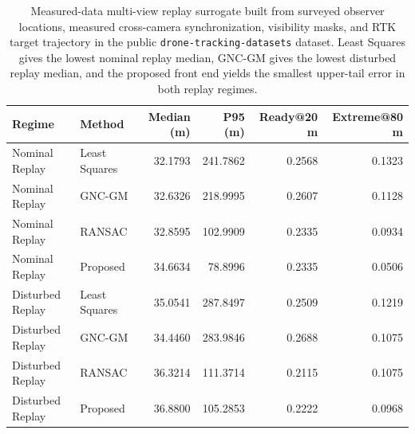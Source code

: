 \begin{table}[!htbp]
\centering
\caption{Measured-data multi-view replay surrogate built from surveyed observer locations, measured cross-camera synchronization, visibility masks, and RTK target trajectory in the public \texttt{drone-tracking-datasets} dataset. Least Squares gives the lowest nominal replay median, GNC-GM gives the lowest disturbed replay median, and the proposed front end yields the smallest upper-tail error in both replay regimes.}
\label{tab:publicrealreplay}
\small
\begin{tabular}{llrrrr}
\toprule
Regime & Method & Median (m) & P95 (m) & Ready@20 m & Extreme@80 m \\
\midrule
Nominal Replay   & Least Squares & 32.1793 & 241.7862 & 0.2568 & 0.1323 \\
Nominal Replay   & GNC-GM        & 32.6326 & 218.9995 & 0.2607 & 0.1128 \\
Nominal Replay   & RANSAC        & 32.8595 & 102.9909 & 0.2335 & 0.0934 \\
Nominal Replay   & Proposed      & 34.6634 &  78.8996 & 0.2335 & 0.0506 \\
\midrule
Disturbed Replay & Least Squares & 35.0541 & 287.8497 & 0.2509 & 0.1219 \\
Disturbed Replay & GNC-GM        & 34.4460 & 283.9846 & 0.2688 & 0.1075 \\
Disturbed Replay & RANSAC        & 36.3214 & 111.3714 & 0.2115 & 0.1075 \\
Disturbed Replay & Proposed      & 36.8800 & 105.2853 & 0.2222 & 0.0968 \\
\bottomrule
\end{tabular}
\end{table}
